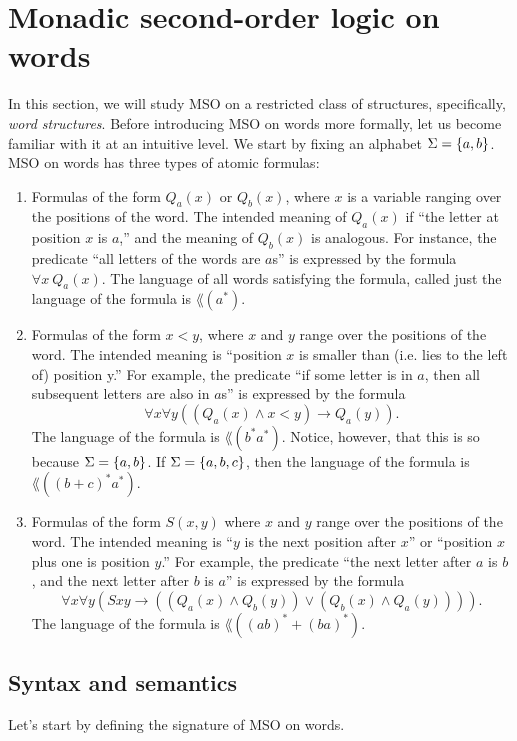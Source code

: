 \documentclass[11pt,twoside=off,numbers=noenddot]{scrbook}
\begin{document}
\section{Monadic second-order logic on words}
In this section, we will study MSO on a restricted class of structures, specifically, \emph{word structures}. Before introducing MSO on words more formally, let us become familiar with it at an intuitive level. We start by fixing an alphabet $\Sigma = \{ a, b \}$. MSO on words has three types of atomic formulas:
\begin{enumerate}
  \item Formulas of the form $Q_a(x)$ or $Q_b(x)$, where $x$ is a variable ranging over the positions of the word. The intended meaning of $Q_a(x)$ if ``the letter at position $x$ is $a$,'' and the meaning of $Q_b(x)$ is analogous. For instance, the predicate ``all letters of the words are $a$s'' is expressed by the formula $\forall x \ Q_a(x)$. The language of all words satisfying the formula, called just the language of the formula is $\lang(a^\ast)$.
  \item Formulas of the form $x < y$, where $x$ and $y$ range over the positions of the word. The intended meaning is ``position $x$ is smaller than (i.e. lies to the left of) position y.'' For example, the predicate ``if some letter is in $a$, then all subsequent letters are also in $a$s'' is expressed by the formula
    \[ \forall x \forall y ((Q_a(x) \wedge x < y) \rightarrow Q_a(y)). \]
    The language of the formula is $\lang(b^\ast a^\ast)$. Notice, however, that this is so because $\Sigma = \{ a, b \}$. If $\Sigma = \{ a, b, c \}$, then the language of the formula is $\lang((b + c)^\ast a^\ast)$.
  \item Formulas of the form $S(x, y)$ where $x$ and $y$ range over the positions of the word. The intended meaning is ``$y$ is the next position after $x$'' or ``position $x$ plus one is position $y$.'' For example, the predicate ``the next letter after $a$ is $b$, and the next letter after $b$ is $a$'' is expressed by the formula
    \[ \forall x \forall y (S x y \rightarrow ((Q_a(x) \wedge Q_b(y)) \vee (Q_b(x) \wedge Q_a(y)))). \]
    The language of the formula is $\lang((ab)^\ast + (ba)^\ast)$.
\end{enumerate}

\subsection{Syntax and semantics}
Let's start by defining the signature of MSO on words.
\end{document}
